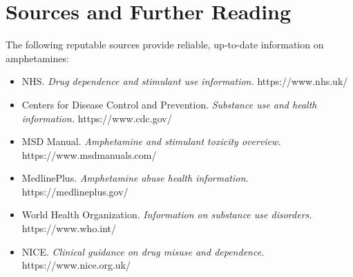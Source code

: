 \section*{Sources and Further Reading}
The following reputable sources provide reliable, up-to-date information on amphetamines:

\begin{itemize}
    \item NHS. \textit{Drug dependence and stimulant use information.} https://www.nhs.uk/
    \item Centers for Disease Control and Prevention. \textit{Substance use and health information.} https://www.cdc.gov/
    \item MSD Manual. \textit{Amphetamine and stimulant toxicity overview.} https://www.msdmanuals.com/
    \item MedlinePlus. \textit{Amphetamine abuse health information.} https://medlineplus.gov/
    \item World Health Organization. \textit{Information on substance use disorders.} https://www.who.int/
    \item NICE. \textit{Clinical guidance on drug misuse and dependence.} https://www.nice.org.uk/
\end{itemize}

